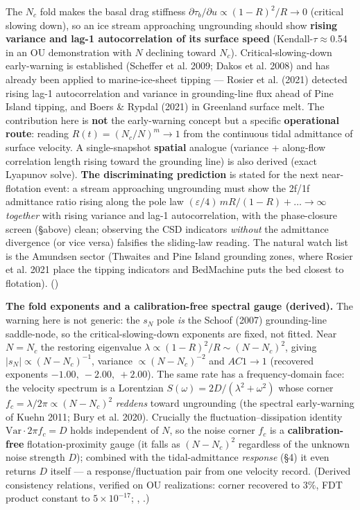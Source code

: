 \documentclass[11pt]{article}
\begin{document}
The $N_{c}$ fold makes the basal drag stiffness $\partial \tau _{b}/\partial u\propto (1-R)^{2}/R\to 0$ (critical slowing down), so an ice stream approaching ungrounding should show \textbf{rising variance and lag-1 autocorrelation of its surface speed} (Kendall-\ensuremath{\tau}\ensuremath{\approx}0.54 in an OU demonstration with $N$ declining toward $N_{c}$). Critical-slowing-down early-warning is established (Scheffer et al. 2009; Dakos et al. 2008) and has already been applied to marine-ice-sheet tipping — Rosier et al. (2021) detected rising lag-1 autocorrelation and variance in grounding-line flux ahead of Pine Island tipping, and Boers \& Rypdal (2021) in Greenland surface melt. The contribution here is \textbf{not} the early-warning concept but a specific \textbf{operational route}: reading $R(t)=(N_{c}/N)^{m}\to 1$ from the continuous tidal admittance of surface velocity. A single-snapshot \textbf{spatial} analogue (variance + along-flow correlation length rising toward the grounding line) is also derived (exact Lyapunov solve). \textbf{The discriminating prediction} is stated for the next near-flotation event: a stream approaching ungrounding must show the 2f/1f admittance ratio rising along the pole law $(\varepsilon /4)\,mR/(1-R)+\ldots \to \infty $ \emph{together} with rising variance and lag-1 autocorrelation, with the phase-closure screen (§above) clean; observing the CSD indicators \emph{without} the admittance divergence (or vice versa) falsifies the sliding-law reading. The natural watch list is the Amundsen sector (Thwaites and Pine Island grounding zones, where Rosier et al. 2021 place the tipping indicators and BedMachine puts the bed closest to flotation). ()


\textbf{The fold exponents and a calibration-free spectral gauge (derived).} The warning here is not generic: the $s_{N}$ pole \emph{is} the Schoof (2007) grounding-line saddle-node, so the critical-slowing-down exponents are fixed, not fitted. Near $N=N_{c}$ the restoring eigenvalue $\lambda \propto (1-R)^{2}/R\sim (N-N_{c})^{2}$, giving $|s_{N}|\propto (N-N_{c})^{-1}$, variance $\propto (N-N_{c})^{-2}$ and $AC1\to 1$ (recovered exponents $-1.00,\ -2.00,\ +2.00$). The same rate has a frequency-domain face: the velocity spectrum is a Lorentzian $S(\omega )=2D/(\lambda ^{2}+\omega ^{2})$ whose corner $f_{c}=\lambda /2\pi \propto (N-N_{c})^{2}$ \emph{reddens} toward ungrounding (the spectral early-warning of Kuehn 2011; Bury et al. 2020). Crucially the fluctuation--dissipation identity $\mathrm{Var}\cdot 2\pi f_{c}=D$ holds independent of $N$, so the noise corner $f_{c}$ is a \textbf{calibration-free} flotation-proximity gauge (it falls as $(N-N_{c})^{2}$ regardless of the unknown noise strength $D$); combined with the tidal-admittance \emph{response} (§4) it even returns $D$ itself --- a response/fluctuation pair from one velocity record. (Derived consistency relations, verified on OU realizations: corner recovered to $3\%$, FDT product constant to $5\times 10^{-17}$; , .)
\end{document}
